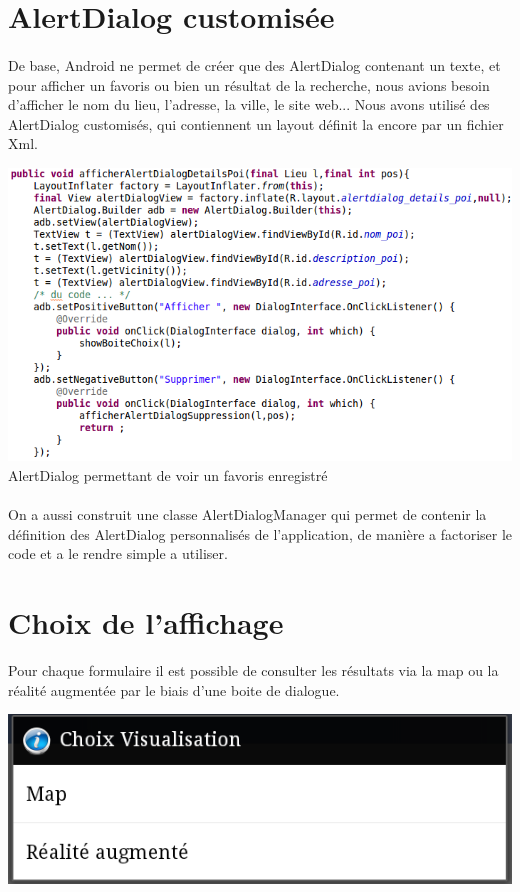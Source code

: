 \section*{AlertDialog customisée}
\paragraph{}
De base, Android ne permet de créer que des AlertDialog contenant un texte, et pour afficher un favoris ou bien un résultat de la recherche, nous avions besoin d'afficher le nom du lieu, l'adresse, la ville, le site web...
Nous avons utilisé des AlertDialog customisés, qui contiennent un layout définit la encore par un fichier Xml. 

\begin{center}
	\includegraphics[width=140mm]{images/alertdialog.png}
	AlertDialog permettant de voir un favoris enregistré 
\end{center}
\paragraph{}
On a aussi construit une classe AlertDialogManager qui permet de contenir la définition des AlertDialog personnalisés de l'application, de manière a factoriser le code et a le rendre simple a utiliser.

\section*{Choix de l'affichage}
Pour chaque formulaire il est possible de consulter les résultats via la map ou la réalité augmentée par le biais d'une boite de dialogue.

\begin{center}
	\includegraphics[width=140mm]{images/choix.png}
\end{center}


